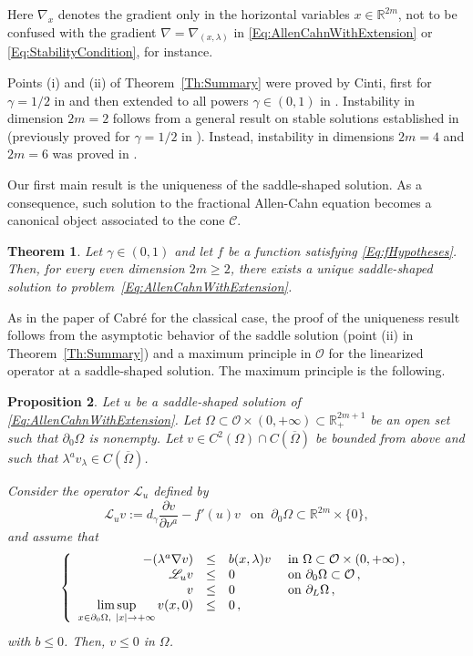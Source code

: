 \documentclass[12pt,reqno]{amsart}
\newtheorem{theorem}{Theorem}[section]
\newtheorem{proposition}[theorem]{Proposition}
\theoremstyle{definition}
\theoremstyle{remark}
\newcommand{\con}[1]{\mathbb{#1}}
\newcommand{\R}{\con{R}} %
\newcommand{\ccal}{\mathscr{C}}
\newcommand{\ocal}{\mathcal{O}}
\newcommand{\s}{\gamma}
\newcommand\beqc[1]{\left\{\begin{array}{#1}}
\newcommand\eeqc{\end{array} \right.}
\def\PDEsystem{rcll}
\let\div\relax
\DeclareMathOperator{\div}{div}
\def\ds{\displaystyle}
\numberwithin{equation}{section}
\begin{document}
Here $\nabla_x$ denotes the gradient only in the horizontal variables $x\in \R^{2m}$, not to be confused with the gradient $\nabla = \nabla_{(x,\lambda)}$ in \eqref{Eq:AllenCahnWithExtension} or \eqref{Eq:StabilityCondition}, for instance.

Points (i) and (ii) of Theorem~\ref{Th:Summary} were proved by Cinti, first for $\s = 1/2$  in \cite{Cinti-Saddle} and then extended to all powers $\s \in (0,1)$ in \cite{Cinti-Saddle2}. Instability in dimension $2m = 2$ follows from a general result on stable solutions established in \cite{CabreSireII} (previously proved for $\s = 1/2$ in \cite{CabreSolaMorales}). Instead, instability in dimensions $2m=4$ and $2m=6$ was proved in \cite{Cinti-Saddle,Cinti-Saddle2}.


Our first main result is the uniqueness of the saddle-shaped solution. As a consequence, such solution to the fractional Allen-Cahn equation becomes a canonical object associated to the cone $\ccal$.

\begin{theorem}
\label{Thm:Uniqueness}
Let $\s \in (0,1)$  and let $f$ be a function satisfying \eqref{Eq:fHypotheses}. Then, for every even dimension $2m\geq 2$, there exists a unique saddle-shaped solution to problem~\eqref{Eq:AllenCahnWithExtension}.
\end{theorem}

As in the paper of Cabré \cite{Cabre-Saddle} for the classical case, the proof of the uniqueness result follows from the asymptotic behavior of the saddle solution (point (ii) in Theorem~\ref{Th:Summary}) and a maximum principle in $\ocal$ for the linearized operator at a saddle-shaped solution. The maximum principle is the following.

\begin{proposition}
\label{Prop:MaxPrincipleLinearizedOperator}
Let $u$ be a saddle-shaped solution of \eqref{Eq:AllenCahnWithExtension}. 
Let $\Omega \subset \ocal \times (0,+\infty) \subset \R^{2m+1}_+$ be an open set such that $\partial_0 \Omega$ is nonempty. Let $v \in C^2 (\Omega)\cap C(\overline{\Omega})$ be bounded from above and such that $\lambda^a v_\lambda \in C(\overline{\Omega})$. 

Consider the operator $\mathscr{L}_u $ defined by 
\begin{equation}
\label{Eq:LinearizedOperator}
\mathscr{L}_u v := d_\s \dfrac{\partial v}{\partial \nu^a}  -f'(u) v \ \ \text{ on } \ \partial_0 \Omega \subset \R^{2m}\times\{0\},
\end{equation}
and assume that
$$
\beqc{\PDEsystem}
-\div(\lambda^a \nabla v) &\leq& b(x,\lambda) v & \text{ in } \Omega \subset \ocal \times (0,+\infty)\,, \\
\mathscr{L}_u v &\leq & 0 & \text{ on } \partial_0 \Omega \subset \ocal \,, \\
v & \leq & 0 & \text{ on } \partial_L \Omega \,,\\
\ds \limsup_{x\in \partial_0 \Omega, \  |x|\to +\infty} v(x,0) & \leq & 0\,,
\eeqc
$$
with $b \leq 0$. Then, $v\leq 0$ in $\Omega$.
\end{proposition}
\end{document}
